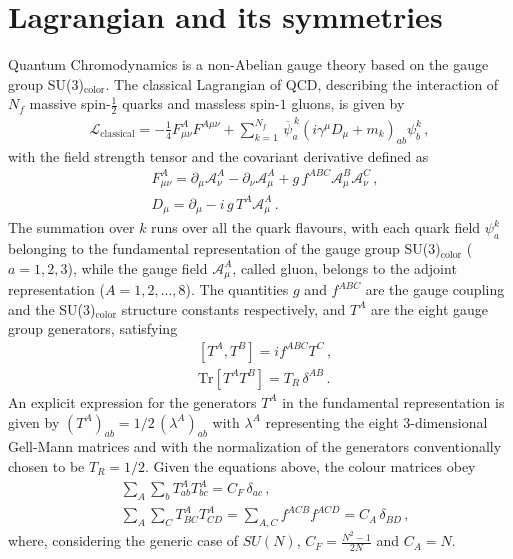 \section{Lagrangian and its symmetries}
%
Quantum Chromodynamics is a non-Abelian gauge theory based on the gauge group SU(3)$_\text{color}$.
The classical Lagrangian of QCD, describing the interaction of $N_f$ massive spin-$\frac{1}{2}$ quarks
and massless spin-$1$ gluons, is given by
\begin{align}
    \label{eq:QCD_lagrangian}
    \mathcal{L}_{\mathrm{classical}} = -\frac{1}{4}F^{A}_{\mu\nu}F^{A\mu\nu} + 
    \sum_{k=1}^{N_f}\,{\overline{\psi}}^{\,k}_a\left(i\gamma^{\mu}D_{\mu} + m_k\right)_{ab}\psi^k_b\,,
\end{align}
with the field strength tensor and the covariant derivative defined as
\begin{align}
    \label{eq:field_strength_thensor}
    &F^{A}_{\mu\nu} = \partial_{\mu} \mathcal{A}^A_{\nu} - \partial_{\nu} \mathcal{A}^A_{\mu} 
    + g \, f^{ABC} \mathcal{A}^B_{\mu}\mathcal{A}^C_{\nu}\,, \\
    \label{eq:covariant_derivateive}
    &D_{\mu} = \partial_{\mu} - i\,g\,T^A \mathcal{A}^{A}_{\mu}\,.
\end{align}
The summation over $k$ runs over all the quark flavours, with
each quark field $\psi^k_a$ belonging to the fundamental representation of the gauge group SU(3)$_\text{color}$ ($a=1,2,3$),
while the gauge field $\mathcal{A}^A_{\mu}$, called gluon, belongs to the adjoint representation
($A=1,2,...,8$). The quantities $g$ and $f^{ABC}$ are the gauge coupling and the SU(3)$_\text{color}$ structure constants
respectively, and $T^A$ are the eight gauge group generators, satisfying
\begin{align}
    \label{eq:algebra}
    &\left[T^A,T^B\right] = i f^{ABC} T^C\,, \\
    \label{eq:normalization_SU3_generators}
    &\text{Tr}\left[T^A T^B\right] = T_R\, \delta^{AB}\,.
\end{align} 
An explicit expression for the generators $T^A$ in the fundamental representation is given by
$(T^A)_{ab} = 1/2\,\left(\lambda^A\right)_{ab}$ with $\lambda^A$ representing the eight 3-dimensional Gell-Mann matrices
and with the normalization of the generators conventionally chosen to be $T_R = 1/2$.
Given the equations above, the colour matrices obey
\begin{align}
    \label{eq:SU3_generators_relations}
    &\sum_A\sum_b T^A_{ab} T^A_{bc} = C_F\, \delta_{ac}\,,\\
    &\sum_{A}\sum_C T^A_{BC} T^A_{CD} = \sum_{A,C} f^{ACB} f^{ACD} =  C_A\, \delta_{BD}\,,
\end{align}
where, considering the generic case of $SU(N)$, $C_F = \frac{N^2-1}{2N}$ and $C_A = N$.

